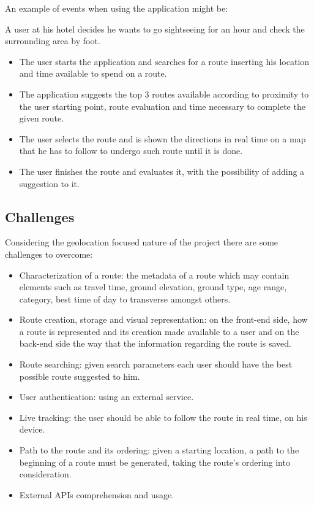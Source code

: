 \documentclass{article}
\begin{document}
            An example of events when using the application might be:

            A user at his hotel decides he wants to go sightseeing for an hour and check the surrounding area by foot.
        
        \begin{itemize}  
            \item The user starts the application and searches for a route inserting his location and time available to spend on a route.
            \item The application suggests the top 3 routes available according to proximity to the user starting point, route evaluation and time necessary to complete the given route. 
            \item The user selects the route and is shown the directions in real time on a map that he has to follow to undergo such route until it is done.
            \item The user finishes the route and evaluates it, with the possibility of adding a suggestion to it. 
        \end{itemize}
        
        \subsection{Challenges}
            
            Considering the geolocation focused nature of the project there are some challenges to overcome:

            \begin{itemize}
                \item Characterization of a route: the metadata of a route which may contain elements such as travel time, ground elevation, ground type, age range, category, best time of day to transverse amongst others.
                \item Route creation, storage and visual representation: on the front-end side, how a route is represented and its creation made available to a user and on the back-end side the way that the information regarding the route is saved.
                \item Route searching: given search parameters each user should have the best possible route suggested to him.  
                \item User authentication: using an external service.
                \item Live tracking: the user should be able to follow the route in real time, on his device.
                \item Path to the route and its ordering: given a starting location, a path to the beginning of a route must be generated, taking the route's ordering into consideration.
                \item External APIs comprehension and usage.
            \end{itemize}
\end{document}
